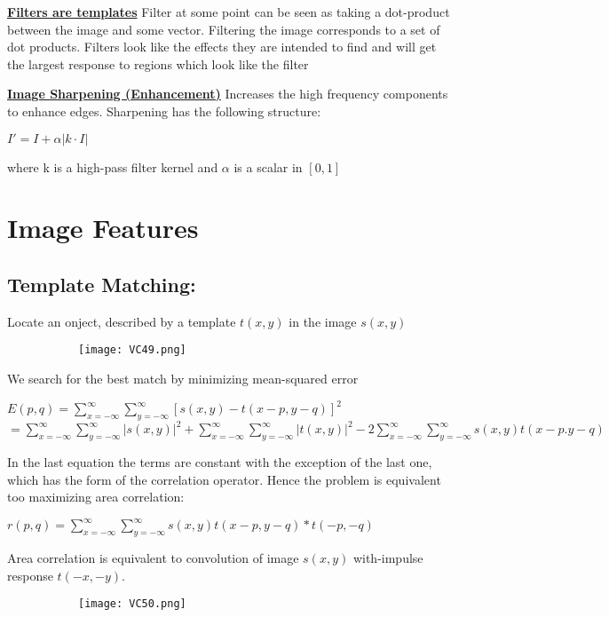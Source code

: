 \documentclass[8pt]{extreport}
\begin{document}
\underline{\textbf{Filters are templates}} Filter at some point can be seen as taking a dot-product between the image and some vector. Filtering the image corresponds to a set of dot products. Filters look like the effects they are intended to find and will get the largest response to regions which look like the filter

\underline{\textbf{Image Sharpening (Enhancement)}} Increases the high frequency components to enhance edges. Sharpening has the following  structure:
\begin{center}
$I' = I + \alpha |k\cdot I|$
\end{center}
where k is a high-pass filter kernel and $\alpha$ is a scalar in $[0,1]$

\chapter{Image Features}
 
\section{Template Matching:} Locate an onject, described by a template $t(x,y)$ in the image $s(x,y)$
\begin{figure}[H]
\centering
\begin{subfigure}[b]{0.32\linewidth}
\texttt{[image: VC49.png]}
\end{subfigure}
\end{figure}
We search for the best match by minimizing mean-squared error
\begin{center}
$E(p,q) = \displaystyle\sum_{x=-\infty}^{\infty}  \displaystyle\sum_{y=-\infty}^{\infty} [s(x,y) - t(x-p,y-q)]^2$\\
$=\displaystyle\sum_{x=-\infty}^{\infty}  \displaystyle\sum_{y=-\infty}^{\infty}|s(x,y)|^2 + \displaystyle\sum_{x=-\infty}^{\infty}  \displaystyle\sum_{y=-\infty}^{\infty} |t(x,y)|^2 - 2 \displaystyle\sum_{x=-\infty}^{\infty}  \displaystyle\sum_{y=-\infty}^{\infty} s(x,y)t(x-p.y-q)$
\end{center}
In the last equation the terms are constant with the exception of the last one, which has the form of the correlation operator. Hence the problem is equivalent too maximizing area correlation:
\begin{center}
$r(p,q) = \displaystyle\sum_{x=-\infty}^{\infty}  \displaystyle\sum_{y=-\infty}^{\infty} s(x,y)t(x-p,y-q) \ast t(-p,-q)$
\end{center}
Area correlation is equivalent to convolution of image $s(x,y)$ with-impulse response $t(-x,-y)$.
\begin{figure}[H]
\centering
\begin{subfigure}[b]{0.32\linewidth}
\texttt{[image: VC50.png]}
\end{subfigure}
\end{figure} 
\end{document}
